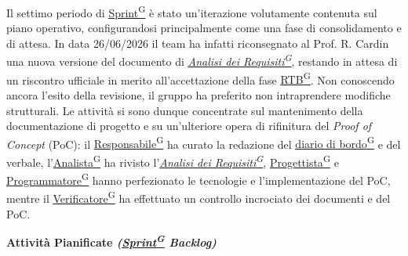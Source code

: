 \documentclass[a4paper,12pt]{article}
\providecommand{\glslink}[2]{\href{https://alittlebyte-19.github.io/Documentazione/glossario.html\#gls-#1}{\underline{#2}\textsuperscript{\scriptsize G}}}
\begin{document}
Il settimo periodo di \glslink{sprint}{Sprint} è stato un'iterazione volutamente contenuta sul piano operativo, configurandosi principalmente come una fase di consolidamento e di attesa. In data 26/06/2026 il team ha infatti riconsegnato al Prof. R. Cardin una nuova versione del documento di \textit{\glslink{analisi-dei-requisiti-adr}{Analisi dei Requisiti}}, restando in attesa di un riscontro ufficiale in merito all'accettazione della fase \glslink{rtb-requirements-and-technology-baseline}{RTB}.
Non conoscendo ancora l'esito della revisione, il gruppo ha preferito non intraprendere modifiche strutturali. Le attività si sono dunque concentrate sul mantenimento della documentazione di progetto e su un'ulteriore opera di rifinitura del \textit{Proof of Concept} (PoC): il \glslink{responsabile}{Responsabile} ha curato la redazione del \glslink{diario-di-bordo}{diario di bordo} e del verbale, l'\glslink{analista}{Analista} ha rivisto l'\textit{\glslink{analisi-dei-requisiti-adr}{Analisi dei Requisiti}}, \glslink{progettista}{Progettista} e \glslink{programmatore}{Programmatore} hanno perfezionato le tecnologie e l'implementazione del PoC, mentre il \glslink{verificatore}{Verificatore} ha effettuato un controllo incrociato dei documenti e del PoC.

\begin{center}
\noindent\textbf{Attività Pianificate \textit{(\glslink{sprint}{Sprint} Backlog)}}\\
\end{center}
\end{document}
